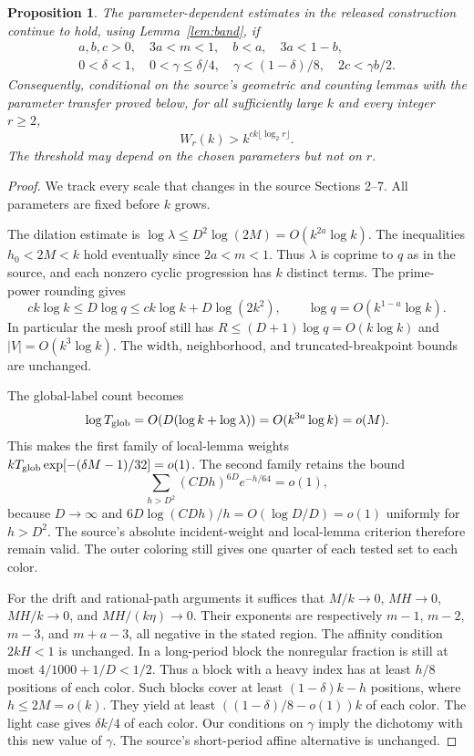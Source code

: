 \documentclass[11pt]{article}
\newtheorem{proposition}{Proposition}
\begin{document}
\begin{proposition}\label{prop:region}
The parameter-dependent estimates in the released construction continue
to hold, using Lemma~\ref{lem:band}, if
\begin{gather*}
 a,b,c>0,\quad 3a<m<1,\quad b<a,\quad 3a<1-b,\\
 0<\delta<1,\quad 0<\gamma\le\delta/4,\quad
 \gamma<(1-\delta)/8,\quad 2c<\gamma b/2.
\end{gather*}
Consequently, conditional on the source's geometric and counting lemmas
with the parameter transfer proved below, for all sufficiently large $k$
and every integer $r\ge2$,
\[
 W_r(k)>k^{ck\lfloor\log_2r\rfloor}.
\]
The threshold may depend on the chosen parameters but not on $r$.
\end{proposition}
\begin{proof}
We track every scale that changes in the source Sections 2--7.
All parameters are fixed before $k$ grows.

The dilation estimate is
$\log\lambda\le D^2\log(2M)=O(k^{2a}\log k)$.
The inequalities $h_0<2M<k$ hold eventually since $2a<m<1$.
Thus $\lambda$ is coprime to $q$ as in the source, and each nonzero
cyclic progression has $k$ distinct terms. The prime-power rounding gives
\[
 ck\log k\le D\log q\le ck\log k+D\log(2k^2),
 \qquad \log q=O(k^{1-a}\log k).
\]
In particular the mesh proof still has
$R\le(D+1)\log q=O(k\log k)$ and $|V|=O(k^3\log k)$.
The width, neighborhood, and truncated-breakpoint bounds are unchanged.

The global-label count becomes
\[
 \log T_{\rm glob}=O(D(\log k+\log\lambda))
 =O(k^{3a}\log k)=o(M).
\]
This makes the first family of local-lemma weights
$kT_{\rm glob}\exp[-(\delta M-1)/32]=o(1)$.
The second family retains the bound
\[
 \sum_{h>D^2}(CDh)^{6D}e^{-h/64}=o(1),
\]
because $D\to\infty$ and
$6D\log(CDh)/h=O(\log D/D)=o(1)$ uniformly for $h>D^2$.
The source's absolute incident-weight and local-lemma criterion therefore
remain valid. The outer coloring still gives one quarter of each tested
set to each color.

For the drift and rational-path arguments it suffices that $M/k\to0$,
$MH\to0$, $MH/k\to0$, and $MH/(k\eta)\to0$.
Their exponents are respectively $m-1$, $m-2$, $m-3$, and $m+a-3$,
all negative in the stated region. The affinity condition $2kH<1$
is unchanged. In a long-period block the nonregular fraction is still
at most $4/1000+1/D<1/2$. Thus a block with a heavy index has at least
$h/8$ positions of each color. Such blocks cover at least
$(1-\delta)k-h$ positions, where $h\le2M=o(k)$.
They yield at least $((1-\delta)/8-o(1))k$ of each color.
The light case gives $\delta k/4$ of each color. Our conditions on
$\gamma$ imply the dichotomy with this new value of $\gamma$.
The source's short-period affine alternative is unchanged.


\end{proof}
\end{document}
